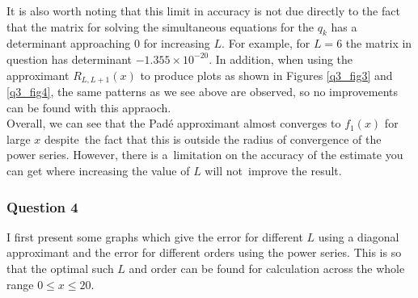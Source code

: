 \documentclass[12pt, a4paper]{article}
\begin{document}

It is also worth noting that this limit in accuracy is not due directly to the fact that the matrix
for solving the simultaneous equations for the $q_{k}$ has a determinant approaching 0 for
increasing $L$. For example, for $L = 6$ the matrix in question has determinant 
$-1.355\times 10^{-20}$. In addition, when using the approximant $R_{L,L+1}(x)$ to  
produce plots as shown in Figures \ref{q3_fig3} and \ref{q3_fig4}, the same patterns
as we see above are observed, so no improvements can be found with this appraoch.
\\

Overall, we can see that the Pad\'e approximant almost converges to $f_{1}(x)$ for large $x$ despite\ 
the fact that this is outside the radius of convergence of the power series. However, there is a\ 
limitation on the accuracy of the estimate you can get where increasing the value of $L$ will not\ 
improve the result.

\newpage

\subsubsection*{Question 4}

I first present some graphs which give the error for different $L$ using a diagonal approximant and
the error for different orders using the power series. This is so that the optimal such $L$ and order
can be found for calculation across the whole range $0 \leq x \leq 20$.

\vspace{0.5cm}
\end{document}
